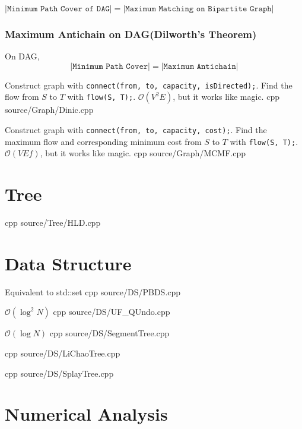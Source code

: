 \documentclass[portrait, 8pt, a4paper, oneside, twocolumn]{extarticle}
\begin{document}
$|\texttt{Minimum Path Cover of DAG}| = |\texttt{Maximum Matching on Bipartite Graph}|$ 


\subsubsection{Maximum Antichain on DAG(Dilworth's Theorem)}
On DAG, $$|\texttt{Minimum Path Cover}| = |\texttt{Maximum Antichain}|$$


{Construct graph with \texttt{connect(from, to, capacity, isDirected);}. Find the flow from $S$ to $T$ with \texttt{flow(S, T);}. }
{$\mathcal O(V^2E)$, but it works like magic.}
{cpp}
{source/Graph/Dinic.cpp}

{Construct graph with \texttt{connect(from, to, capacity, cost);}. Find the maximum flow and corresponding minimum cost from $S$ to $T$ with \texttt{flow(S, T);}.}
{$\mathcal O(VEf)$, but it works like magic.}
{cpp}
{source/Graph/MCMF.cpp}

\section{Tree}

{}
{}
{cpp}
{source/Tree/HLD.cpp}

\section{Data Structure}

{}
{Equivalent to std::set}
{cpp}
{source/DS/PBDS.cpp}


{}
{$\mathcal O(\log^2N)$}
{cpp}
{source/DS/UF_QUndo.cpp}

{}
{$\mathcal O(\log N)$}
{cpp}
{source/DS/SegmentTree.cpp}

{}
{}
{cpp}
{source/DS/LiChaoTree.cpp}

{}
{}
{cpp}
{source/DS/SplayTree.cpp}

\section{Numerical Analysis}
\end{document}
